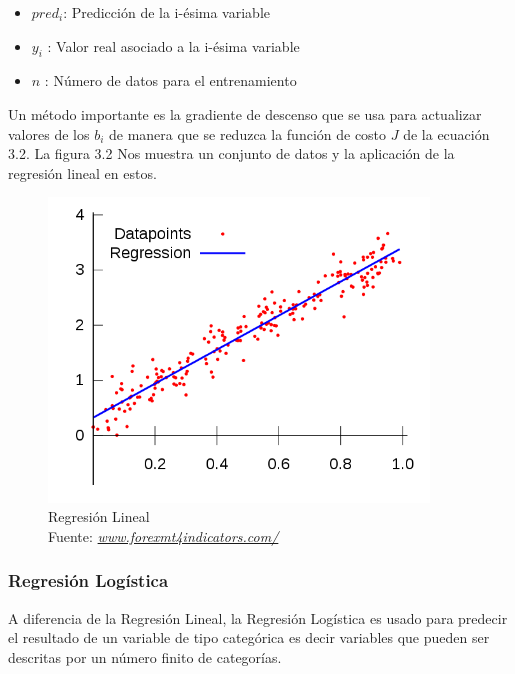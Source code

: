 \begin{itemize}
	\item $pred_{i}$: Predicción de la i-ésima variable
	\item $y_{i}$   : Valor real asociado a la i-ésima variable
	\item $n$       : Número de datos para el entrenamiento
	
\end{itemize}
Un método importante es la gradiente de descenso que se usa para actualizar valores de los $b_{i}$ de manera que se reduzca la función de costo $J$ de la ecuación 3.2. La figura 3.2 Nos muestra un conjunto de datos y la aplicación de la regresión lineal en estos.
\begin{figure}[H]
	\centering
	\includegraphics[width=0.9\textwidth]{Figures/Linear.png}
	\caption{Regresión Lineal \\ Fuente:  \href{https://www.forexmt4indicators.com/linear-regression-mt4-indicator/}{\textit{www.forexmt4indicators.com/}}}
	\label{Regresión Lineal}
\end{figure} 

\subsubsection*{Regresión Logística}
A diferencia de la Regresión Lineal, la Regresión Logística es usado para predecir el resultado de un variable de tipo categórica es decir variables que pueden ser descritas por un número finito de categorías.

